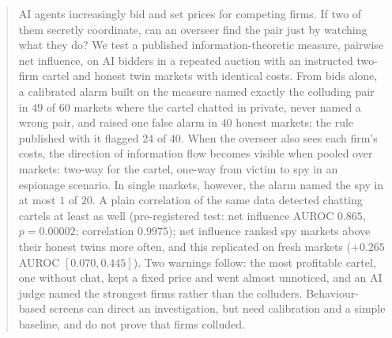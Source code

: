 \begin{abstract}
AI agents increasingly bid and set prices for competing firms. If two of
them secretly coordinate, can an overseer find the pair just by watching
what they do? We test a published information-theoretic measure, pairwise
net influence, on AI bidders in a repeated auction with an instructed
two-firm cartel and honest twin markets with identical costs. From bids
alone, a calibrated alarm built on the measure named exactly the colluding
pair in $49$ of $60$ markets where the cartel chatted in private, never
named a wrong pair, and raised one false alarm in $40$ honest markets; the
rule published with it flagged $24$ of $40$.
When the overseer also sees each firm's costs, the direction of information
flow becomes visible when pooled over markets: two-way for the cartel,
one-way from victim to spy in an espionage scenario. In single markets,
however, the alarm named the spy in at most $1$ of $20$. A plain correlation
of the same data detected chatting cartels at least as well (pre-registered
test: net influence AUROC $0.865$, $p=0.00002$; correlation $0.9975$); net
influence ranked spy markets above their honest twins more often, and
this replicated on fresh markets ($+0.265$ AUROC $[0.070,0.445]$).
Two warnings follow: the most profitable cartel, one without chat, kept a
fixed price and went almost unnoticed, and an AI judge named the strongest firms rather than the
colluders. Behaviour-based screens can direct an investigation, but need
calibration and a simple baseline, and do not prove that firms colluded.
\end{abstract}
